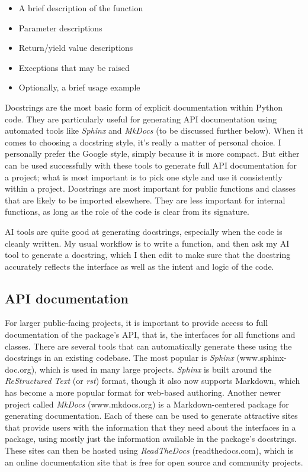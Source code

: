 \begin{itemize}
\item A brief description of the function
\item Parameter descriptions
\item Return/yield value descriptions
\item Exceptions that may be raised
\item Optionally, a brief usage example
\end{itemize}

Docstrings are the most basic form of explicit documentation within Python code.  They are particularly useful for generating API documentation using automated tools like \textit{Sphinx} and \textit{MkDocs} (to be discussed further below). When it comes to choosing a docstring style, it's really a matter of personal choice. I personally prefer the Google style, simply because it is more compact. But either can be used successfully with these tools to generate full API documentation for a project; what is most important is to pick one style and use it consistently within a project. Docstrings are most important for public functions and classes that are likely to be imported elsewhere.  They are less important for internal functions, as long as the role of the code is clear from its signature.

AI tools are quite good at generating docstrings, especially when the code is cleanly written.  My usual workflow is to write a function, and then ask my AI tool to generate a docstring, which I then edit to make sure that the docstring accurately reflects the interface as well as the intent and logic of the code.

\subsection{API documentation}

For larger public-facing projects, it is important to provide access to full documentation of the package's API, that is, the interfaces for all functions and classes.  There are several tools that can automatically generate these using the docstrings in an existing codebase.  The most popular is \textit{Sphinx} (www.sphinx-doc.org), which is used in many large projects.  \textit{Sphinx} is built around the \textit{ReStructured Text} (or \textit{rst}) format, though it also now supports Markdown, which has become a more popular format for web-based authoring. Another newer project called \textit{MkDocs} (www.mkdocs.org) is a Markdown-centered package for generating documentation.  Each of these can be used to generate attractive sites that provide users with the information that they need about the interfaces in a package, using mostly just the information available in the package's docstrings.  These sites can then be hosted using \textit{ReadTheDocs} (readthedocs.com), which is an online documentation site that is free for open source and community projects.

